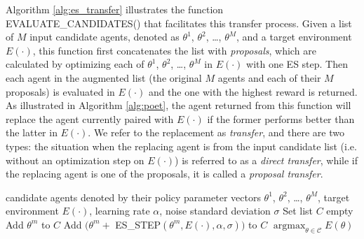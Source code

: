 \documentclass{article}
\DeclareMathOperator*{\argmax}{argmax}
\newcommand{\ks}[1]{\comments{\textcolor{purple}{[Ken: #1]}}}
\newcommand{\rw}[1]{\comments{\textcolor{blue}{[Rui: #1]}}}
\newcommand{\comments}[1]{#1}
\begin{document}

Algorithm \ref{alg:es_transfer} illustrates the function EVALUATE\_CANDIDATES() that facilitates this transfer process. Given a list of $M$ input candidate agents, denoted as $\theta^{1}$, $\theta^{2}$, \ldots, $\theta^{M}$, and a target environment $E(\cdot)$, this function first concatenates the list with \emph{proposals}, which are calculated by optimizing each of $\theta^{1}$, $\theta^{2}$, \ldots, $\theta^{M}$ in $E(\cdot)$ with one ES step. Then each agent in the augmented list (the original $M$ agents and each of their $M$ proposals) is evaluated in $E(\cdot)$ and the one with the highest reward is returned. As illustrated in Algorithm \ref{alg:poet}, the agent returned from this function will replace the agent currently paired with $E(\cdot)$ if the former performs better than the latter in $E(\cdot)$. We refer to the replacement as \emph{transfer}, and there are two types: the situation when the replacing agent is from the input candidate list (i.e. without an optimization step on $E(\cdot)$) is referred to as a \emph{direct transfer}, while if the replacing agent is one of the proposals, it is called a \emph{proposal transfer}. 

\begin{algorithm}[htp]
\caption{EVALUATE\_CANDIDATES}
\label{alg:es_transfer}
\begin{algorithmic}[1]
    candidate agents denoted by their policy parameter vectors $\theta^{1}$, $\theta^{2}$, \ldots, $\theta^{M}$, target environment $E(\cdot)$,  learning rate $\alpha$, noise standard deviation $\sigma$
    Set list $C$ empty 
   \STATE Add $\theta^{m}$ to $C$
   \STATE Add $(\theta^{m} +$ ES\_STEP$(\theta^{m}, E(\cdot), \alpha, \sigma)) $ to $C$
   \ENDFOR
    $\argmax_{\theta \in \mathcal{C}} E(\theta) $

   
\end{algorithmic}
\end{algorithm}
\end{document}
